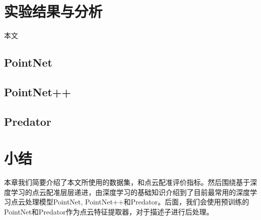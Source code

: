 \section{实验结果与分析}
本文
\subsection{PointNet}
\subsection{PointNet++}
\subsection{Predator}

\section{小结}
本章我们简要介绍了本文所使用的数据集，和点云配准评价指标。然后围绕基于深度学习的点云配准层层递进，由深度学习的基础知识介绍到了目前最常用的深度学习点云处理模型PointNet, PointNet++和Predator。后面，我们会使用预训练的PointNet和Predator作为点云特征提取器，对于描述子进行后处理。